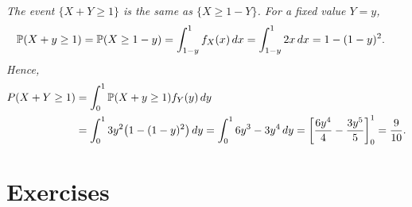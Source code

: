 \begin{solution}
\it %
The event $\{X+Y\geq 1\}$ is the same as $\{X\geq 1-Y\}$. For a fixed value $Y=y$,
\begin{align*}
\mathbb{P}(X+y\geq 1)
	& = \mathbb{P} (X\geq 1-y)  
	= \int_{1-y}^1 f_X(x)\,dx 
	= \int_{1-y}^1 2x\,dx 
	= 1-(1-y)^2.
\end{align*}
Hence,
\begin{align*}
P(X+Y\geq 1) 
	& = \int_0^1 \mathbb{P}(X+y\geq 1)f_Y(y)\,dy \\
	& = \int_0^1 3y^2\big(1-(1-y)^2\big)\,dy 
	= \int_0^1 6y^3 - 3y^4\,dy 
	= \left[\frac{6y^4}{4}-\frac{3y^5}{5}\right]_0^1 
	= \frac{9}{10}.
\end{align*}

\een
\end{solution}

\section{Exercises}


\endinput
